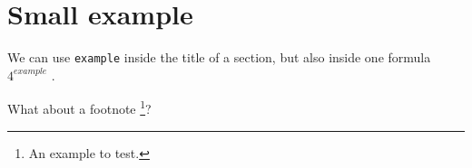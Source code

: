\documentclass[12pt]{article}
\begin{document}
\section{Small example}

We can use \verb#example# inside the title of a section,
but also inside one formula $4^{example}$ .

What about a footnote
\footnote{
	An example to test.
}?
\end{document}
